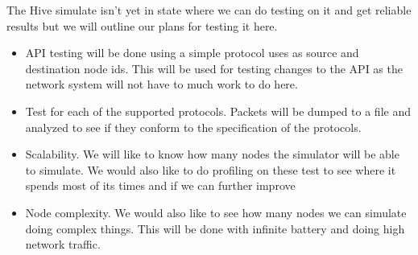 
The Hive simulate isn't yet in state where we can do testing on
it and get reliable results but we will outline our plans for 
testing it here.

\begin{itemize}
	\item API testing will be done using a simple protocol
	uses as source and destination node ids. This will be used
	for testing changes to the API as the network system will not
	have to much work to do here.
	\item Test for each of the supported protocols. Packets
	will be dumped to a file and analyzed to see if they conform
	to the specification of the protocols.
	\item Scalability. We will like to know how many nodes
	the simulator will be able to simulate. We would also
	like to do profiling on these test to see where it
	spends most of its times and if we can further improve
	\item Node complexity. We would also like to see how
	many nodes we can simulate doing complex things. This
	will be done with infinite battery and doing high network
	traffic.
\end{itemize}
